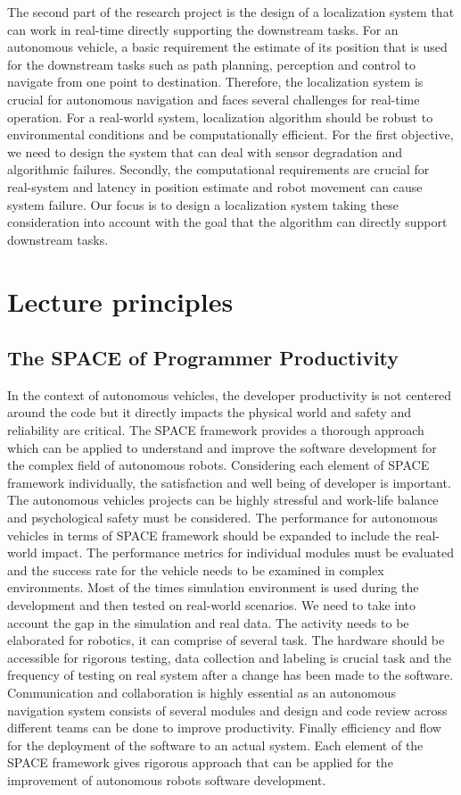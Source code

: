 \documentclass{article}
\begin{document}
The second part of the research project is the design of a localization system that can work in real-time directly supporting the downstream tasks. For an autonomous vehicle, a basic requirement the estimate of its position that is used for the downstream tasks such as path planning, perception and control to navigate from one point to destination. Therefore, the localization system is crucial for autonomous navigation and faces several challenges for real-time operation. For a real-world system, localization algorithm should be robust to environmental conditions and be computationally efficient. For the first objective, we need to design the system that can deal with sensor degradation and algorithmic failures. Secondly, the computational requirements are crucial for real-system and latency in position estimate and robot movement can cause system failure. Our focus is to design a localization system taking these consideration into account with the goal that the algorithm can directly support downstream tasks.


\section{Lecture principles}

\subsection{The SPACE of Programmer Productivity}

In the context of autonomous vehicles, the developer productivity is not centered around the code but it directly impacts the physical world and safety and reliability are critical. The SPACE framework provides a thorough approach which can be applied to understand and improve the software development for the complex field of autonomous robots. Considering each element of SPACE framework individually, the satisfaction and well being of developer is important. The autonomous vehicles projects can be highly stressful and work-life balance and psychological safety must be considered. The performance for autonomous vehicles in terms of SPACE framework should be expanded to include the real-world impact. The performance metrics for individual modules must be evaluated and the success rate for the vehicle needs to be examined in complex environments. Most of the times simulation environment is used during the development and then tested on real-world scenarios. We need to take into account the gap in the simulation and real data. The activity needs to be elaborated for robotics, it can comprise of several task. The hardware should be accessible for rigorous testing, data collection and labeling is crucial task and the frequency of testing on real system after a change has been made to the software. Communication and collaboration is highly essential as an autonomous navigation system consists of several modules and design and code review across different teams can be done to improve productivity. Finally efficiency and flow for the deployment of the software to an actual system. Each element of the SPACE framework gives rigorous approach that can be applied for the improvement of autonomous robots software development.  
\end{document}
